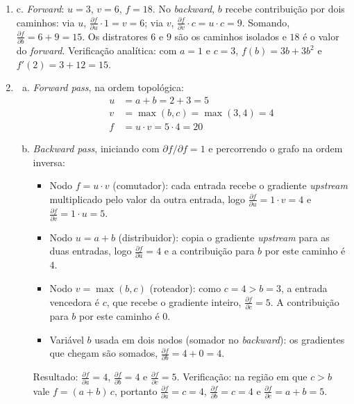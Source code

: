 \documentclass{dlproblemset}
\begin{document}
\begin{enumerate}[1)]
    \item c. \textit{Forward}: $u = 3$, $v = 6$, $f = 18$. No \textit{backward}, $b$ recebe contribuição por dois caminhos: via $u$, $\frac{\partial f}{\partial u} \cdot 1 = v = 6$; via $v$, $\frac{\partial f}{\partial v} \cdot c = u \cdot c = 9$. Somando, $\frac{\partial f}{\partial b} = 6 + 9 = 15$. Os distratores $6$ e $9$ são os caminhos isolados e $18$ é o valor do \textit{forward}. Verificação analítica: com $a=1$ e $c=3$, $f(b) = 3b + 3b^2$ e $f'(2) = 3 + 12 = 15$.

    \item
    \begin{enumerate}[a)]
        \item \textit{Forward pass}, na ordem topológica:
        \begin{align*}
            u &= a + b = 2 + 3 = 5\\
            v &= \max(b, c) = \max(3, 4) = 4\\
            f &= u \cdot v = 5 \cdot 4 = 20
        \end{align*}
        \item \textit{Backward pass}, iniciando com $\partial f/\partial f = 1$ e percorrendo o grafo na ordem inversa:
        \begin{itemize}
            \item Nodo $f = u \cdot v$ (comutador): cada entrada recebe o gradiente \textit{upstream} multiplicado pelo valor da outra entrada, logo $\frac{\partial f}{\partial u} = 1 \cdot v = 4$ e $\frac{\partial f}{\partial v} = 1 \cdot u = 5$.
            \item Nodo $u = a + b$ (distribuidor): copia o gradiente \textit{upstream} para as duas entradas, logo $\frac{\partial f}{\partial a} = 4$ e a contribuição para $b$ por este caminho é $4$.
            \item Nodo $v = \max(b, c)$ (roteador): como $c = 4 > b = 3$, a entrada vencedora é $c$, que recebe o gradiente inteiro, $\frac{\partial f}{\partial c} = 5$. A contribuição para $b$ por este caminho é $0$.
            \item Variável $b$ usada em dois nodos (somador no \textit{backward}): os gradientes que chegam são somados, $\frac{\partial f}{\partial b} = 4 + 0 = 4$.
        \end{itemize}
        Resultado: $\frac{\partial f}{\partial a} = 4$, $\frac{\partial f}{\partial b} = 4$ e $\frac{\partial f}{\partial c} = 5$. Verificação: na região em que $c > b$ vale $f = (a+b)\,c$, portanto $\frac{\partial f}{\partial a} = c = 4$, $\frac{\partial f}{\partial b} = c = 4$ e $\frac{\partial f}{\partial c} = a + b = 5$.
    \end{enumerate}


\end{enumerate}
\end{document}
